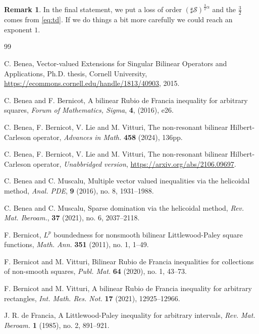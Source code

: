 \documentclass[a4paper,11pt,oneside]{amsart}
\theoremstyle{plain}
\theoremstyle{definition}
\newtheorem{remark}[theorem]{Remark}
\begin{document}
\begin{remark} In the final statement, we put a loss of order $(\sharp {\mathcal S})^{\frac{3}{2} \alpha}$ and the $\frac{3}{2}$ comes from \eqref{eq:td}. If we do things a bit more carefully we could reach an exponent $1$.
\end{remark}

\begin{thebibliography}{99}

C. Benea, Vector-valued Extensions for Singular Bilinear Operators and Applications, Ph.D. thesis, Cornell University, \href{https://ecommons.cornell.edu/handle/1813/40903}{https://ecommons.cornell.edu/handle/1813/40903}, 2015.

 C. Benea and F. Bernicot,  A bilinear Rubio de Francia inequality for arbitrary squares, {\it Forum of Mathematics, Sigma}, {\bf 4}, (2016), e26. 

 C. Benea, F. Bernicot, V. Lie and M. Vitturi, The non-resonant bilinear Hilbert-Carleson operator, {\it Advances in Math.} \textbf{458} (2024), 136pp. 

 C. Benea, F. Bernicot, V. Lie and M. Vitturi, The non-resonant bilinear Hilbert-Carleson operator, {\it Unabbridged version}, \href{https://arxiv.org/abs/2106.09697}{https://arxiv.org/abs/2106.09697}. 

C. Benea and C. Muscalu, Multiple vector valued inequalities via the helicoidal method, {\it Anal. PDE}, \textbf{9} (2016), no. 8, 1931--1988.

C. Benea and C. Muscalu, Sparse domination via the helicoidal method, {\it Rev. Mat. Iberoam.}, \textbf{37} (2021), no. 6, 2037--2118.


 F. Bernicot, $L^p$ boundedness for nonsmooth bilinear Littlewood-Paley square functions, {\it Math. Ann.} \textbf{351} (2011), no. 1, 1--49. 

 F. Bernicot and M. Vitturi, Bilinear Rubio de Francia inequalities for collections of non-smooth squares, {\it Publ. Mat.} \textbf{64} (2020), no. 1, 43--73. 

 F. Bernicot and M. Vitturi, A bilinear Rubio de Francia inequality for arbitrary rectangles, {\it Int. Math. Res. Not.} \textbf{17} (2021), 12925--12966.

 J. R. de Francia, A Littlewood-Paley inequality for arbitrary intervals, {\it Rev. Mat. Iberoam.} \textbf{1} (1985), no. 2, 891--921.


\end{thebibliography}
\end{document}
